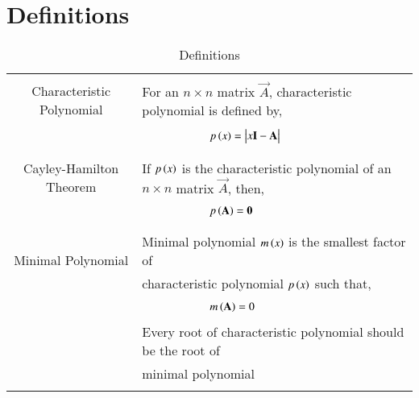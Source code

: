\documentclass[journal,12pt]{IEEEtran}
\begin{document}
\pagebreak
\section{\textbf{Definitions}}
\renewcommand{\thetable}{1}
\begin{table}[ht!]
\centering
\begin{tabular}{|c|l|}
    \hline
	\multirow{3}{*}{Characteristic Polynomial} 
	& \\
	& For an $n\times n$ matrix $\vec{A}$, characteristic polynomial is defined by,\\
	&\\
	& $\qquad\qquad\qquad p\brak{x}=\mydet{x\Vec{I}-\Vec{A}}$\\
	&\\
	\hline
	\multirow{3}{*}{Cayley-Hamilton Theorem}
    &\\
    & If $p\left(x\right)$ is the characteristic polynomial of an $n\times n$ matrix $\vec{A}$, then,\\
    &\\
    &$\qquad \qquad \qquad p\left(\mathbf{A}\right)=\mathbf{0}$\\
    &\\
    \hline
	\multirow{3}{*}{Minimal Polynomial} 
	&\\
	& Minimal polynomial $m\left(x\right)$ is the smallest factor of\\
	&characteristic polynomial $p\left(x\right)$ such that,\\
	&\\
	& $\qquad \qquad \qquad m\left(\mathbf{A}\right)=0$\\
	& \\
	& Every root of characteristic polynomial should be the root of\\
	&minimal polynomial\\
	&\\
    \hline
\end{tabular}
\label{table:1}
    \caption{Definitions}
\end{table}
\newpage
\end{document}
